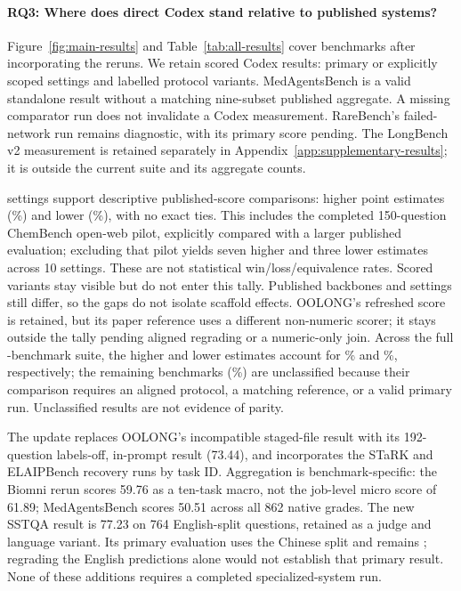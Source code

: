 \paragraph{RQ3: Where does direct Codex stand relative to published systems?}
Figure~\ref{fig:main-results} and Table~\ref{tab:all-results} cover \StudyBenchmarkCount{}
benchmarks after incorporating the reruns. We retain \RetainedCodexCount{} scored Codex results:
\PrimaryCodexCount{} primary or explicitly scoped settings and \VariantCodexCount{} labelled
protocol variants. MedAgentsBench is a valid standalone result without a matching nine-subset
published aggregate. A missing comparator run does not invalidate a Codex measurement.
RareBench's failed-network run remains diagnostic, with its primary score pending.
The LongBench v2 measurement is retained separately in Appendix~\ref{app:supplementary-results};
it is outside the current suite and its aggregate counts.

\PaperComparisonCount{} settings support descriptive published-score comparisons:
\PaperHigherCount{} higher point estimates (\PaperHigherPercent\%) and
\PaperLowerCount{} lower (\PaperLowerPercent\%), with no exact ties. This includes the completed
150-question ChemBench open-web pilot, explicitly compared with a larger published evaluation;
excluding that pilot yields seven higher and three lower estimates across 10 settings.
These are not statistical win/loss/equivalence rates. Scored variants stay visible but do not
enter this tally. Published backbones and settings still differ, so the gaps do not isolate
scaffold effects. OOLONG's refreshed score is retained, but its paper reference uses a different
non-numeric scorer; it stays outside the tally pending aligned regrading or a numeric-only join.
Across the full \StudyBenchmarkCount{}-benchmark suite, the \PaperHigherCount{} higher and
\PaperLowerCount{} lower estimates account for \SuiteHigherPercent\% and
\SuiteLowerPercent\%, respectively; the remaining \PaperUnclassifiedCount{} benchmarks
(\SuiteUnclassifiedPercent\%) are unclassified because
their comparison requires an aligned protocol, a matching reference, or a valid primary run.
Unclassified results are not evidence of parity.

The update replaces OOLONG's incompatible staged-file result with its 192-question labels-off,
in-prompt result (73.44), and incorporates the STaRK and ELAIPBench recovery runs by task ID.
Aggregation is benchmark-specific: the Biomni rerun scores 59.76 as a ten-task macro, not the
job-level micro score of 61.89; MedAgentsBench scores 50.51 across all 862 native grades.
The new SSTQA result is 77.23 on 764 English-split questions, retained as a judge and language
variant. Its primary evaluation uses the Chinese split and remains ; regrading
the English predictions alone would not establish that primary result. None of these additions
requires a completed specialized-system run.

